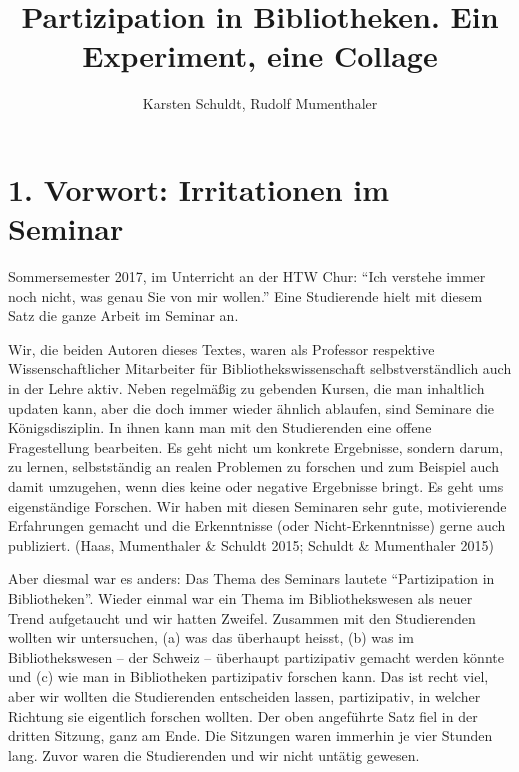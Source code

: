 \documentclass[a4paper,
fontsize=11pt,
oneside,
numbers=noperiodatend,
parskip=half-,
bibliography=totoc,
final
]{scrartcl}
\title{\LARGE{Partizipation in Bibliotheken. Ein Experiment, eine Collage}} %
\author{Karsten Schuldt, Rudolf Mumenthaler} %
\date{}
\begin{document}
\maketitle
\thispagestyle{fancyplain} 


\hypertarget{vorwort-irritationen-im-seminar}{%
\section{1. Vorwort: Irritationen im
Seminar}\label{vorwort-irritationen-im-seminar}}

Sommersemester 2017, im Unterricht an der HTW Chur: \enquote{Ich
verstehe immer noch nicht, was genau Sie von mir wollen.} Eine
Studierende hielt mit diesem Satz die ganze Arbeit im Seminar an.

Wir, die beiden Autoren dieses Textes, waren als Professor respektive
Wissenschaftlicher Mitarbeiter für Bibliothekswissenschaft
selbstverständlich auch in der Lehre aktiv. Neben regelmäßig zu gebenden
Kursen, die man inhaltlich updaten kann, aber die doch immer wieder
ähnlich ablaufen, sind Seminare die Königsdisziplin. In ihnen kann man
mit den Studierenden eine offene Fragestellung bearbeiten. Es geht nicht
um konkrete Ergebnisse, sondern darum, zu lernen, selbstständig an
realen Problemen zu forschen und zum Beispiel auch damit umzugehen, wenn
dies keine oder negative Ergebnisse bringt. Es geht ums eigenständige
Forschen. Wir haben mit diesen Seminaren sehr gute, motivierende
Erfahrungen gemacht und die Erkenntnisse (oder Nicht-Erkenntnisse) gerne
auch publiziert. (Haas, Mumenthaler \& Schuldt 2015; Schuldt \&
Mumenthaler 2015)

Aber diesmal war es anders: Das Thema des Seminars lautete
\enquote{Partizipation in Bibliotheken}. Wieder einmal war ein Thema im
Bibliothekswesen als neuer Trend aufgetaucht und wir hatten Zweifel.
Zusammen mit den Studierenden wollten wir untersuchen, (a) was das
überhaupt heisst, (b) was im Bibliothekswesen -- der Schweiz --
überhaupt partizipativ gemacht werden könnte und (c) wie man in
Bibliotheken partizipativ forschen kann. Das ist recht viel, aber wir
wollten die Studierenden entscheiden lassen, partizipativ, in welcher
Richtung sie eigentlich forschen wollten. Der oben angeführte Satz fiel
in der dritten Sitzung, ganz am Ende. Die Sitzungen waren immerhin je
vier Stunden lang. Zuvor waren die Studierenden und wir nicht untätig
gewesen.
\end{document}

